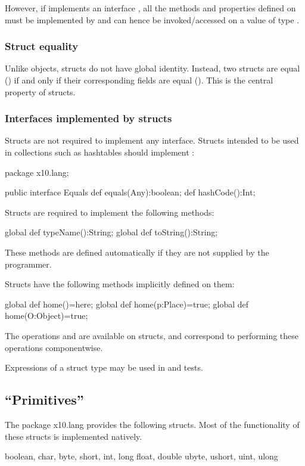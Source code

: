 However,
if  implements an interface , all the methods and properties defined
on  must be implemented by  and can hence be invoked/accessed on a
value of type . 

\subsubsection{Struct equality}

Unlike objects, structs do not have global identity. Instead, two
structs are equal (\Xcd{==}) if and only if their corresponding fields are
equal (\Xcd{==}). This is the central property of structs.

\subsubsection{Interfaces implemented by structs}
Structs are not required to implement any interface. Structs intended
to be used in collections such as hashtables should implement
:
\begin{xten}
package x10.lang;  

public interface Equals {
    def equals(Any):boolean;
    def hashCode():Int;
}
\end{xten}
Structs are required to implement the following methods: 
\begin{xten}
  global def typeName():String;
  global def toString():String;  
\end{xten}
These methods are defined automatically if they are not supplied by the programmer.

Structs have the following methods implicitly defined on them:
\begin{xten}
  global def home()=here;
  global def home(p:Place)=true;
  global def home(O:Object)=true;
\end{xten}

The operations \Xcd{==} and \Xcd{!=} are available on structs, and
correspond to performing these operations componentwise.

Expressions  of a struct type may be used in  and  tests.

\subsection{``Primitives''}

The package x10.lang provides the following structs. Most of the functionality of these structs is implemented natively. 
\begin{xten}
boolean, char, 
byte, short, int, long
float, double
ubyte, ushort, uint, ulong
\end{xten}
 
